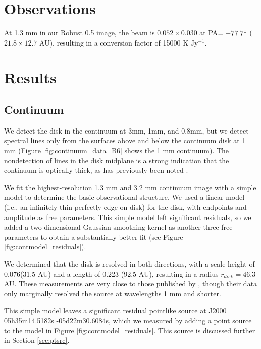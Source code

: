 \documentclass[twocolumn]{aastex61}
\begin{document}
\section{Observations}

At 1.3 mm in our Robust 0.5 image, the beam is $0.052\times0.030$ \arcsec at
PA$=-77.7^{\circ}$ ($21.8\times12.7$ AU), resulting in a 
conversion factor of 15000 K Jy$^{-1}$.

\section{Results}

\subsection{Continuum}
We detect the disk in the continuum at 3mm, 1mm, and 0.8mm, but we detect
spectral lines only from the surfaces above and below the continuum disk at 1
mm (Figure \ref{fig:continuum_data_B6} shows the 1 mm continuum).  The nondetection of
lines in the disk midplane is a strong indication that the continuum is
optically thick, as has previously been noted
\citep[e.g.][]{Plambeck2016a}.

We fit the highest-resolution 1.3 mm and 3.2 mm continuum image with a simple
model to determine the basic
observational structure.  We used a linear model (i.e., an infinitely thin
perfectly edge-on disk) for the disk, with endpoints and amplitude as free parameters.
This simple model left significant residuals, so we added a two-dimensional
Gaussian smoothing kernel as another three free parameters to obtain a
substantially better fit (see Figure \ref{fig:contmodel_residuals}).

We determined that the disk is resolved in both
directions, with a scale height of 0.076\arcsec (31.5 AU) and a length of 0.223
\arcsec (92.5 AU), resulting in a radius $r_{disk}=46.3$ AU.  These measurements
are very close to those published by \citet{Plambeck2016a}, though their data
only marginally resolved the source at wavelengths 1 mm and shorter.

This simple model leaves a significant residual pointlike source at
J2000 05h35m14.5182s -05d22m30.6084s, which we measured by adding a point
source to the model in Figure \ref{fig:contmodel_residuals}.
This source is discussed further in Section \ref{sec:ptsrc}.



\end{document}
